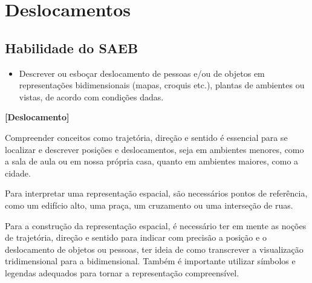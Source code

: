 
\chapter{Deslocamentos}

\section{Habilidade do SAEB }
\begin{itemize}
\item Descrever ou esboçar deslocamento de pessoas e/ou
de objetos em representações bidimensionais (mapas, croquis etc.),
plantas de ambientes ou vistas, de acordo com condições dadas.
\end{itemize}

\textbf{{[}Deslocamento{]}}

Compreender conceitos como trajetória, direção e sentido é essencial
para se localizar e descrever posições e deslocamentos, seja em
ambientes menores, como a sala de aula ou em nossa própria casa, quanto
em ambientes maiores, como a cidade.

Para interpretar uma representação espacial, são necessários pontos de
referência, como um edifício alto, uma praça, um cruzamento ou uma
interseção de ruas.

Para a construção da representação espacial, é necessário ter em mente
as noções de trajetória, direção e sentido para indicar com precisão a
posição e o deslocamento de objetos ou pessoas, ter ideia de como
transcrever a visualização tridimensional para a bidimensional. Também é
importante utilizar símbolos e legendas adequados para tornar a
representação compreensível.

